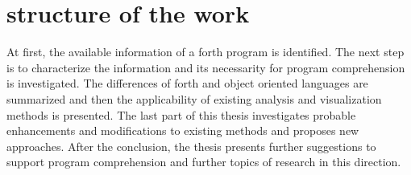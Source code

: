 \section{structure of the work}

At first, the available information of a forth program is identified. The next step is to characterize the information and its necessarity for program comprehension is investigated. The differences of forth and object oriented languages are summarized and then the applicability of existing analysis and visualization methods is presented.
The last part of this thesis investigates probable enhancements and modifications to existing methods and proposes new approaches.
After the conclusion, the thesis presents further suggestions to support program comprehension and further topics of research in this direction.
